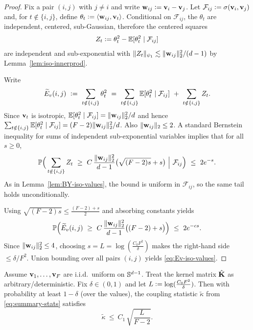 \begin{proof}
Fix a pair $(i,j)$ with $j\neq i$ and write ${\mathbf{w}}_{ij}\vcentcolon= {\mathbf{v}}_{i}-{\mathbf{v}}_{j}$.
Let
\(
\mathcal{F}_{ij}\vcentcolon= \sigma({\mathbf{v}}_{i},{\mathbf{v}}_{j})
\)
and, for $t\notin\{i,j\}$, define $\theta_{t}\vcentcolon= \langle {{\mathbf{w}}_{ij}}, {{\mathbf{v}}_t} \rangle$.
Conditional on $\mathcal{F}_{ij}$, the $\theta_{t}$ are independent, centered, sub-Gaussian, therefore the centered squares
\[
Z_{t}\vcentcolon= \theta_{t}^2-\mathbb{E}[\theta_{t}^2\mid \mathcal{F}_{ij}]
\]
are independent and sub-exponential with
\(
\|Z_{t}\|_{\psi_1}\lesssim \|{\mathbf{w}}_{ij}\|_{2}^2/(d-1)
\)
by Lemma~\ref{lem:iso-innerprod}.

Write
\[
\widetilde{E}_{v}(i,j)\ \defeq\ \sum_{t\notin\{i,j\}}\theta_{t}^2
\ =\ \sum_{t\notin\{i,j\}}\E[\theta_{t}^2\mid\mathcal{F}_{ij}]
\ +\ \sum_{t\notin\{i,j\}}Z_{t}.
\]
Since ${\mathbf{v}}_{t}$ is isotropic, $\mathbb{E}[\theta_{t}^2\mid\mathcal{F}_{ij}]=\|{\mathbf{w}}_{ij}\|_{2}^2/d$ and hence
$\sum_{t\notin\{i,j\}}\mathbb{E}[\theta_{t}^2\mid\mathcal{F}_{ij}]=(F-2)\|{\mathbf{w}}_{ij}\|_{2}^2/d$.
Also $\|{\mathbf{w}}_{ij}\|_{2}\le 2$.
A standard Bernstein inequality for sums of independent sub-exponential variables implies that for all $s\ge 0$,
\[
\Pbb\Big(
\sum_{t\notin\{i,j\}}Z_{t}\ \ge\ C\,\frac{\|\vw_{ij}\|_{2}^2}{d-1}\big(\sqrt{(F-2)s}+s\big)
\ \Big|\ \mathcal{F}_{ij}
\Big)
\ \le\ 2e^{-s}.
\]
As in Lemma~\ref{lem:BY-iso-values}, the bound is uniform in $\mathcal{F}_{ij}$, so the same tail holds unconditionally.

Using $\sqrt{(F-2)s}\le \tfrac{(F-2)+s}{2}$ and absorbing constants yields
\[
\Pbb\Big(
\widetilde{E}_{v}(i,j)\ \ge\ C\,\frac{\|\vw_{ij}\|_{2}^2}{d-1}\big((F-2)+s\big)
\Big)
\ \le\ 2e^{-cs}.
\]
Since $\|{\mathbf{w}}_{ij}\|_{2}^2\le 4$, choosing $s= L=\log(\tfrac{C_{0} F^2}{\delta})$ makes the right-hand side
$\le \delta/F^2$.
Union bounding over all pairs $(i,j)$ yields \eqref{eq:Ev-iso-values}.
\end{proof}


\begin{lemma}
\label{lem:kappa-iso-values}
Assume ${\mathbf{v}}_{1},\dots,{\mathbf{v}}_{F}$ are i.i.d.\ uniform on $\mathbb{S}^{d-1}$.
Treat the kernel matrix $\hat{\mathbf{K}}$ as arbitrary/deterministic.
Fix $\delta\in(0,1)$ and let $L\vcentcolon= \log(\tfrac{C_{0} F^2}{\delta})$.
Then with probability at least $1-\delta$ (over the values), the coupling statistic $\widetilde{\kappa}$ from \eqref{eq:summary-stats} satisfies
\begin{equation}
\widetilde{\kappa}\ \le\ C_{1}\,\sqrt{\frac{L}{F-2}}.
\label{eq:kappa-iso-values}
\end{equation}
\end{lemma}

